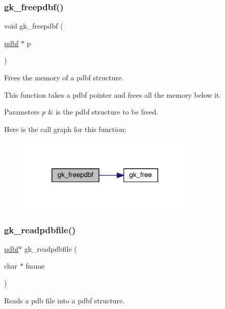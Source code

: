 \subsubsection{\texorpdfstring{gk\+\_\+freepdbf()}{gk\_freepdbf()}}
{\footnotesize\ttfamily void gk\+\_\+freepdbf (\begin{DoxyParamCaption}\item[{\hyperlink{a00666}{pdbf} $\ast$}]{p }\end{DoxyParamCaption})}



Frees the memory of a pdbf structure. 

This function takes a pdbf pointer and frees all the memory below it.


\begin{DoxyParams}{Parameters}
{\em p} & is the pdbf structure to be freed. \\
\hline
\end{DoxyParams}
Here is the call graph for this function\+:\nopagebreak
\begin{figure}[H]
\begin{center}
\leavevmode
\includegraphics[width=236pt]{a00125_ab49542f55191276b91d65ad61a198ab2_cgraph}
\end{center}
\end{figure}
\mbox{\label{a00125_a297ec0561d579a1772f424fce8886d96}} 
\subsubsection{\texorpdfstring{gk\+\_\+readpdbfile()}{gk\_readpdbfile()}}
{\footnotesize\ttfamily \hyperlink{a00666}{pdbf}$\ast$ gk\+\_\+readpdbfile (\begin{DoxyParamCaption}\item[{char $\ast$}]{fname }\end{DoxyParamCaption})}



Reads a pdb file into a pdbf structure. 

